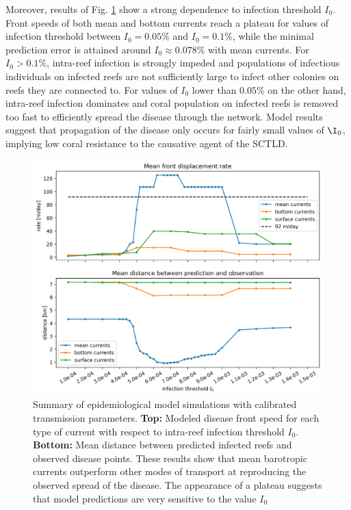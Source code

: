 \documentclass[utf8]{frontiersSCNS}
\begin{document}
Moreover, results of Fig. \ref{fig:results} show a strong dependence to infection threshold $I_0$. Front speeds of both mean and bottom currents reach a plateau for values of infection threshold between $I_0=0.05\%$ and $I_0=0.1\%$, while the minimal prediction error is attained around $I_0 \approx 0.078\%$ with mean currents. For $I_0 > 0.1\%$, intra-reef infection is strongly impeded and populations of infectious individuals on infected reefs are not sufficiently large to infect other colonies on reefs they are connected to. For values of $I_0$ lower than $0.05\%$ on the other hand, intra-reef infection dominates and coral population on infected reefs is removed too fast to efficiently spread the disease through the network. Model results suggest that propagation of the disease only occurs for fairly small values of $\I_0$, implying low coral resistance to the causative agent of the SCTLD. 

\begin{figure}
    \centering
    \includegraphics[width=.8\textwidth]{figures/sctld_validation_corrected.png}
    \caption{Summary of epidemiological model simulations with calibrated transmission parameters. \textbf{Top:} Modeled disease front speed for each type of current with respect to intra-reef infection threshold $I_0$. \textbf{Bottom:} Mean distance between predicted infected reefs and observed disease points. These results show that mean barotropic currents outperform other modes of transport at reproducing the observed spread of the disease. The appearance of a plateau suggests that model predictions are very sensitive to the value $I_0$}
    \label{fig:results}
\end{figure}
\end{document}
